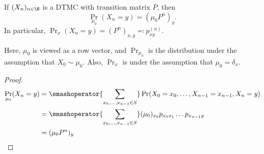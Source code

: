 \begin{theorem}
    If $(X_n)_{n \in \N}$ is a DTMC with transition matrix $P$, then \[
        \Pr_{\mu_0}(X_n = y) = (\mu_0 P^n)_y.
    \] In particular, $\Pr_x(X_n = y) = (P^n)_{x,y} \eqcolon p_{xy}^{(n)}$.
\end{theorem}
Here, $\mu_0$ is viewed as a row vector, and $\Pr_{\mu_0}$ is the distribution
under the assumption that $X_0 \sim \mu_0$.
Also, $\Pr_x$ is under the assumption that $\mu_0 = \delta_x$.
\begin{proof}
    \begin{align*}
        \Pr_{\mu_0}(X_n = y)
            &= \smashoperator{\sum_{x_0, \dots, x_{n-1} \in S}}
                \Pr(X_0 = x_0, \dots, X_{n-1} = x_{n-1}, X_n = y) \\
            &= \smashoperator{\sum_{x_0, \dots, x_{n-1} \in S}}
                (\mu_0)_{x_0} p_{x_0 x_1} \dots p_{x_{n-1} y} \\
            &= (\mu_0 P^n)_y \qedhere
    \end{align*}
\end{proof}


